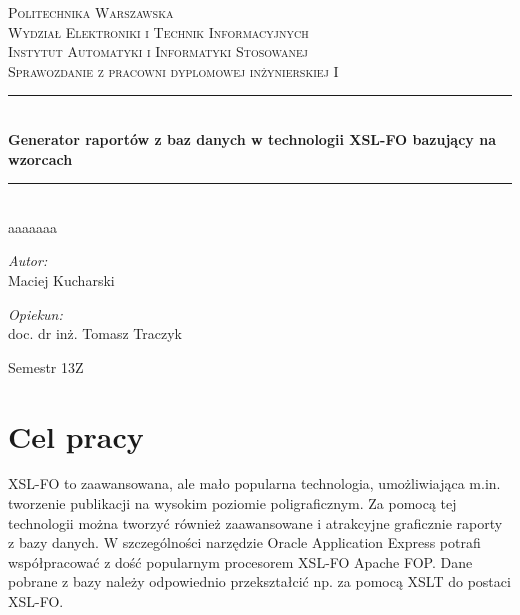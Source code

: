 \documentclass[11pt,a4paper]{article}
\newcommand{\HRule}{\rule{\linewidth}{0.5mm}}
\begin{document}
\begin{titlepage}
\begin{center}
\textsc{\LARGE Politechnika Warszawska}\\[0.5cm]
\textsc{\Large Wydział Elektroniki i Technik Informacyjnych}\\
\textsc{\Large Instytut Automatyki i Informatyki Stosowanej}\\[1.5cm]

\textsc{\Large Sprawozdanie z pracowni dyplomowej inżynierskiej I} \\[0.5cm]
\HRule \\[0.4cm]
{ \huge \bfseries Generator raportów z baz danych w technologii XSL-FO  bazujący na wzorcach \\[0.4cm]}
\HRule \\[1.5cm]
aaaaaaa
\begin{minipage} {0.4\textwidth}
\begin{flushleft} \large
\emph{Autor:}\\
 Maciej Kucharski 
\end{flushleft}
\end{minipage}
\begin{minipage} {0.4\textwidth}
\begin{flushright} \large

\emph{Opiekun:}\\
doc. dr inż. Tomasz Traczyk

\end{flushright}
\end{minipage}	
\vfill
\large Semestr 13Z

	\end{center}
\end{titlepage}
 
\tableofcontents
\newpage

\section{Cel pracy} \label{sec:cel}
XSL-FO to zaawansowana, ale mało popularna technologia, umożliwiająca m.in. tworzenie publikacji na wysokim poziomie poligraficznym. Za pomocą tej technologii można tworzyć również zaawansowane i atrakcyjne graficznie raporty z bazy danych. W szczególności narzędzie Oracle Application Express potrafi współpracować z dość popularnym procesorem XSL-FO Apache FOP. Dane pobrane z bazy należy odpowiednio przekształcić np. za pomocą XSLT do postaci XSL-FO.
\end{document}
